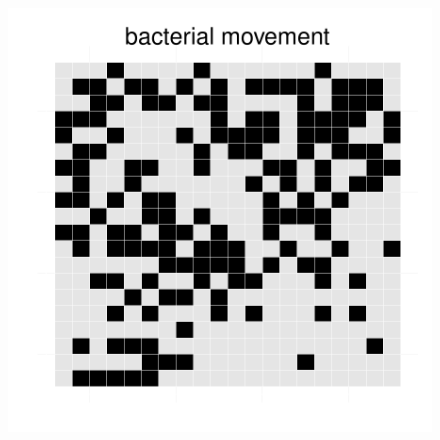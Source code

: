 \begin{figure}[h!]
{\begin{minipage}[t]{0.3\textwidth}
  \end{minipage}
  \begin{minipage}[t]{0.3\textwidth}
    \includegraphics[width=\textwidth]{../results/beijerinckii_20x20_seed943_bac45.pdf}
  \end{minipage}
  }
\end{figure}
